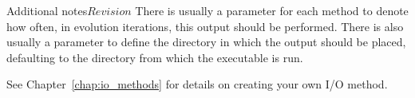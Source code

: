 \begin{cactuspart}{Additional notes}{}{$Revision$}
There is usually a parameter for each method to denote how often, in evolution
iterations, this output should be performed.  There is also usually a parameter
to define the directory in which the output should be placed, defaulting to the
directory from which the executable is run.

See Chapter~\ref{chap:io_methods} for details on creating your own I/O method.



\end{cactuspart}

